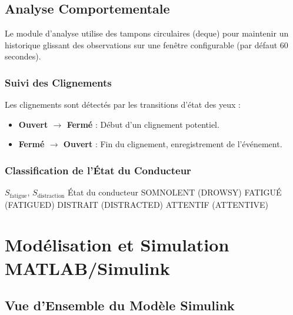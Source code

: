 \documentclass[12pt,a4paper]{report}
\begin{document}
\section{Analyse Comportementale}

Le module d'analyse utilise des tampons circulaires (deque) pour maintenir un historique glissant des observations sur une fenêtre configurable (par défaut 60 secondes).

\subsection{Suivi des Clignements}

Les clignements sont détectés par les transitions d'état des yeux :
\begin{itemize}
    \item \textbf{Ouvert $\rightarrow$ Fermé} : Début d'un clignement potentiel.
    \item \textbf{Fermé $\rightarrow$ Ouvert} : Fin du clignement, enregistrement de l'événement.
\end{itemize}

\subsection{Classification de l'État du Conducteur}

\begin{algorithm}[H]
    \caption{Classification de l'état du conducteur}
    \begin{algorithmic}[1]
        \REQUIRE $S_{\text{fatigue}}$, $S_{\text{distraction}}$
        \ENSURE État du conducteur
            \RETURN SOMNOLENT (DROWSY)
            \RETURN FATIGUÉ (FATIGUED)
            \RETURN DISTRAIT (DISTRACTED)
        \ELSE
            \RETURN ATTENTIF (ATTENTIVE)
        \ENDIF
    \end{algorithmic}
\end{algorithm}

\chapter{Modélisation et Simulation MATLAB/Simulink}

\section{Vue d'Ensemble du Modèle Simulink}
\end{document}
